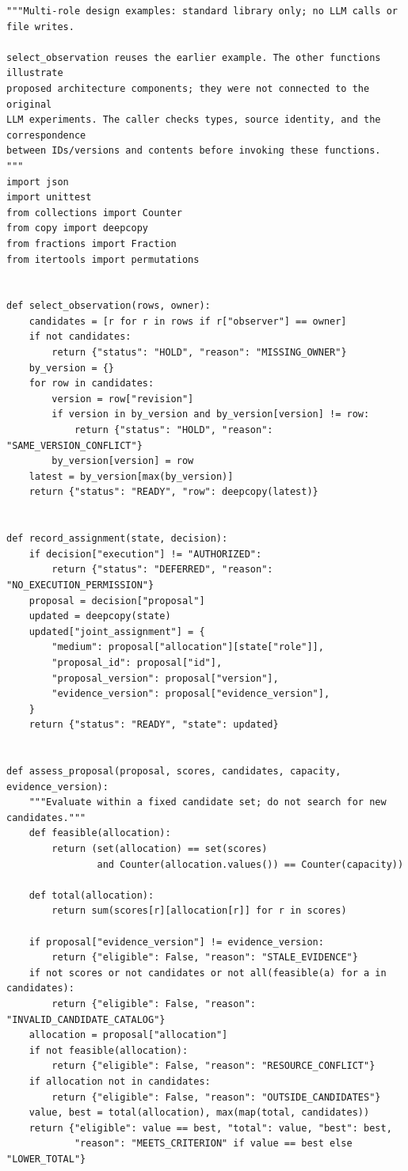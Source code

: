 \documentclass[10pt,a4paper]{article}
\begin{document}
\begin{verbatim}
"""Multi-role design examples: standard library only; no LLM calls or file writes.

select_observation reuses the earlier example. The other functions illustrate
proposed architecture components; they were not connected to the original
LLM experiments. The caller checks types, source identity, and the correspondence
between IDs/versions and contents before invoking these functions.
"""
import json
import unittest
from collections import Counter
from copy import deepcopy
from fractions import Fraction
from itertools import permutations


def select_observation(rows, owner):
    candidates = [r for r in rows if r["observer"] == owner]
    if not candidates:
        return {"status": "HOLD", "reason": "MISSING_OWNER"}
    by_version = {}
    for row in candidates:
        version = row["revision"]
        if version in by_version and by_version[version] != row:
            return {"status": "HOLD", "reason": "SAME_VERSION_CONFLICT"}
        by_version[version] = row
    latest = by_version[max(by_version)]
    return {"status": "READY", "row": deepcopy(latest)}


def record_assignment(state, decision):
    if decision["execution"] != "AUTHORIZED":
        return {"status": "DEFERRED", "reason": "NO_EXECUTION_PERMISSION"}
    proposal = decision["proposal"]
    updated = deepcopy(state)
    updated["joint_assignment"] = {
        "medium": proposal["allocation"][state["role"]],
        "proposal_id": proposal["id"],
        "proposal_version": proposal["version"],
        "evidence_version": proposal["evidence_version"],
    }
    return {"status": "READY", "state": updated}


def assess_proposal(proposal, scores, candidates, capacity, evidence_version):
    """Evaluate within a fixed candidate set; do not search for new candidates."""
    def feasible(allocation):
        return (set(allocation) == set(scores)
                and Counter(allocation.values()) == Counter(capacity))

    def total(allocation):
        return sum(scores[r][allocation[r]] for r in scores)

    if proposal["evidence_version"] != evidence_version:
        return {"eligible": False, "reason": "STALE_EVIDENCE"}
    if not scores or not candidates or not all(feasible(a) for a in candidates):
        return {"eligible": False, "reason": "INVALID_CANDIDATE_CATALOG"}
    allocation = proposal["allocation"]
    if not feasible(allocation):
        return {"eligible": False, "reason": "RESOURCE_CONFLICT"}
    if allocation not in candidates:
        return {"eligible": False, "reason": "OUTSIDE_CANDIDATES"}
    value, best = total(allocation), max(map(total, candidates))
    return {"eligible": value == best, "total": value, "best": best,
            "reason": "MEETS_CRITERION" if value == best else "LOWER_TOTAL"}



\end{verbatim}
\end{document}
